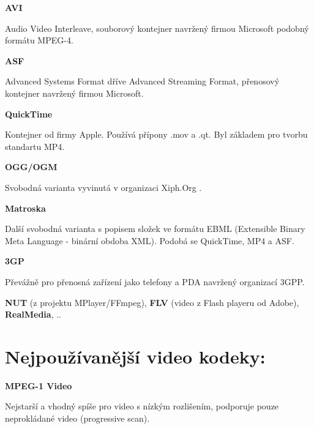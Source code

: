 \vspace{10pt}

\textbf{AVI}

Audio Video Interleave, souborový kontejner navržený firmou Microsoft podobný formátu MPEG-4.

\vspace{10pt}

\textbf{ASF} 

Advanced Systems Format dříve Advanced Streaming Format, přenosový kontejner navržený firmou Microsoft.

\vspace{10pt}

\textbf{QuickTime}

Kontejner od firmy Apple. Používá přípony .mov a .qt. Byl základem pro tvorbu standartu MP4.

\vspace{10pt}

\textbf{OGG/OGM}

Svobodná varianta vyvinutá v organizaci Xiph.Org \cite{xiphURL}.

\vspace{10pt}

\textbf{Matroska}

Další svobodná varianta s popisem složek ve formátu EBML (Extensible Binary Meta Language - binární obdoba XML). Podobá se QuickTime, MP4 a ASF.

\vspace{10pt}

\textbf{3GP}

Převážně pro přenosná zařízení jako telefony a PDA navržený organizací 3GPP.

\vspace{10pt}

\textbf{NUT} (z projektu MPlayer/FFmpeg), \textbf{FLV} (video z Flash playeru od Adobe), \textbf{RealMedia}, ..

\vspace{10pt}

\section{Nejpoužívanější video kodeky:}

\vspace{10pt}

\textbf{MPEG-1 Video}

Nejstarší a vhodný spíše pro video s nízkým rozlišením, podporuje pouze neprokládané video (progressive scan).

